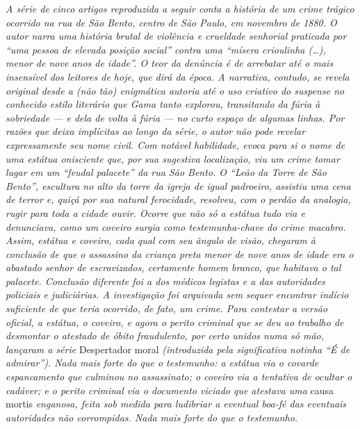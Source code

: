 \begin{didas}
\emph{A série de cinco artigos reproduzida a seguir conta a história de
um crime trágico ocorrido na rua de São Bento, centro de São Paulo, em
novembro de 1880. O autor narra uma história brutal de violência e
crueldade senhorial praticada por ``uma pessoa de elevada posição social''
contra uma ``mísera crioulinha (\ldots{}), menor de nove anos de idade''. O teor
da denúncia é de arrebatar até o mais insensível dos leitores de hoje,
que dirá da época. A narrativa, contudo, se revela original desde a (não
tão) enigmática autoria até o uso criativo do suspense no conhecido
estilo literário que Gama tanto explorou, transitando da fúria à
sobriedade --- e dela de volta à fúria --- no curto espaço de algumas
linhas. Por razões que deixa implícitas ao longo da série, o autor não
pode revelar expressamente seu nome civil. Com notável habilidade,
evoca para si o nome de uma estátua onisciente que, por sua
sugestiva localização, viu um crime tomar lugar em um ``feudal palacete''
da rua São Bento. O ``Leão da Torre de São Bento'', escultura no alto da
torre da igreja de igual padroeiro, assistiu uma cena de terror e, quiçá
por sua natural ferocidade, resolveu, com o perdão da analogia, rugir
para toda a cidade ouvir. Ocorre que não só a estátua tudo via e
denunciava, como um coveiro surgia como testemunha-chave do crime
macabro. Assim, estátua e coveiro, cada qual com seu ângulo de visão,
chegaram à conclusão de que o assassino da criança preta menor
de nove anos de idade era o abastado senhor de escravizados, certamente
homem branco, que habitava o tal palacete. Conclusão diferente foi a dos
médicos legistas e a das autoridades policiais e judiciárias. A
investigação foi arquivada sem sequer encontrar indício suficiente de
que teria ocorrido, de fato, um crime. Para contestar a versão oficial,
a estátua, o coveiro, e agora o perito criminal que se deu ao trabalho
de desmontar o atestado de óbito fraudulento, por certo unidos numa só
mão, lançaram a série} Despertador moral \emph{(introduzida pela
significativa notinha ``É de admirar''). Nada mais forte do que o
testemunho: a estátua via o covarde espancamento que culminou no
assassinato; o coveiro via a tentativa de ocultar o cadáver; e o
perito criminal via o documento viciado que atestava uma} causa mortis
\emph{enganosa, feita sob medida para ludibriar a eventual boa-fé das
eventuais autoridades não corrompidas. Nada mais forte do que o
testemunho.}
\end{didas}



